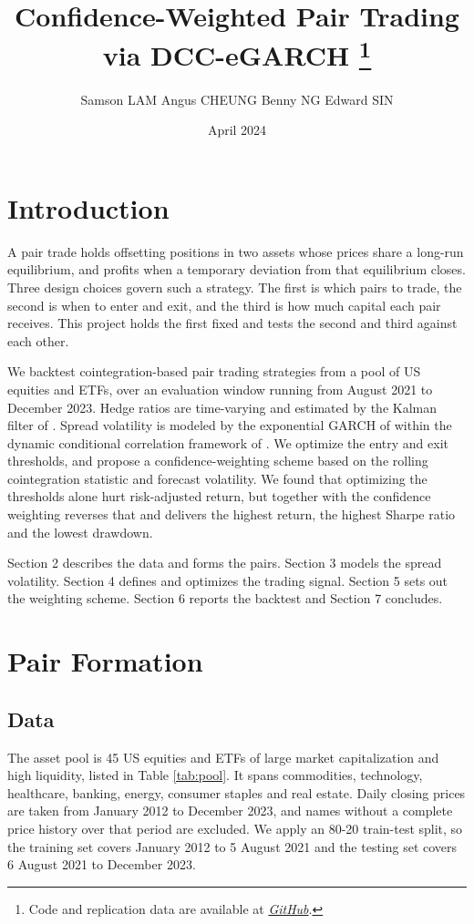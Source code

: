 \documentclass[11pt]{article}
\title{\vspace{-4em}\textbf{Confidence-Weighted Pair Trading via DCC-eGARCH}
\thanks{Code and replication data are available at \href{https://github.com/Softpandaa/confidence-pair-trading}{\textit{GitHub}}.}}
\author{Samson LAM \qquad Angus CHEUNG \qquad Benny NG \qquad Edward SIN}
\date{April 2024}
\begin{document}
\maketitle
\vspace{-2em}

\section{Introduction}

A pair trade holds offsetting positions in two assets whose prices share a long-run equilibrium, and profits when a temporary deviation from that equilibrium closes. Three design choices govern such a strategy. The first is which pairs to trade, the second is when to enter and exit, and the third is how much capital each pair receives. This project holds the first fixed and tests the second and third against each other.

We backtest cointegration-based pair trading strategies from a pool of US equities and ETFs, over an evaluation window running from August 2021 to December 2023. Hedge ratios are time-varying and estimated by the Kalman filter of \citet{kalman1960}. Spread volatility is modeled by the exponential GARCH of \citet{nelson1991} within the dynamic conditional correlation framework of \citet{engle2002}. We optimize the entry and exit thresholds, and propose a confidence-weighting scheme based on the rolling cointegration statistic and forecast volatility. We found that optimizing the thresholds alone hurt risk-adjusted return, but together with the confidence weighting reverses that and delivers the highest return, the highest Sharpe ratio and the lowest drawdown.

Section 2 describes the data and forms the pairs. Section 3 models the spread volatility. Section 4 defines and optimizes the trading signal. Section 5 sets out the weighting scheme. Section 6 reports the backtest and Section 7 concludes.

\section{Pair Formation}

\subsection{Data}

The asset pool is 45 US equities and ETFs of large market capitalization and high liquidity, listed in Table \ref{tab:pool}. It spans commodities, technology, healthcare, banking, energy, consumer staples and real estate. Daily closing prices are taken from January 2012 to December 2023, and names without a complete price history over that period are excluded. We apply an 80-20 train-test split, so the training set covers January 2012 to 5 August 2021 and the testing set covers 6 August 2021 to December 2023.
\end{document}
